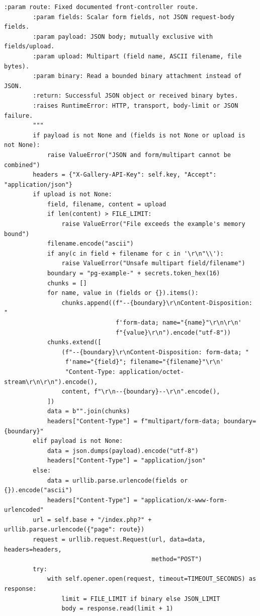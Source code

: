 \documentclass[11pt,a4paper]{article}
\begin{document}
\begin{lstlisting}[language={}]
        :param route: Fixed documented front-controller route.
        :param fields: Scalar form fields, not JSON request-body fields.
        :param payload: JSON body; mutually exclusive with fields/upload.
        :param upload: Multipart (field name, ASCII filename, file bytes).
        :param binary: Read a bounded binary attachment instead of JSON.
        :return: Successful JSON object or received binary bytes.
        :raises RuntimeError: HTTP, transport, body-limit or JSON failure.
        """
        if payload is not None and (fields is not None or upload is not None):
            raise ValueError("JSON and form/multipart cannot be combined")
        headers = {"X-Gallery-API-Key": self.key, "Accept": "application/json"}
        if upload is not None:
            field, filename, content = upload
            if len(content) > FILE_LIMIT:
                raise ValueError("File exceeds the example's memory bound")
            filename.encode("ascii")
            if any(c in field + filename for c in '\r\n"\\'):
                raise ValueError("Unsafe multipart field/filename")
            boundary = "pg-example-" + secrets.token_hex(16)
            chunks = []
            for name, value in (fields or {}).items():
                chunks.append((f"--{boundary}\r\nContent-Disposition: "
                               f'form-data; name="{name}"\r\n\r\n'
                               f"{value}\r\n").encode("utf-8"))
            chunks.extend([
                (f"--{boundary}\r\nContent-Disposition: form-data; "
                 f'name="{field}"; filename="{filename}"\r\n'
                 "Content-Type: application/octet-stream\r\n\r\n").encode(),
                content, f"\r\n--{boundary}--\r\n".encode(),
            ])
            data = b"".join(chunks)
            headers["Content-Type"] = f"multipart/form-data; boundary={boundary}"
        elif payload is not None:
            data = json.dumps(payload).encode("utf-8")
            headers["Content-Type"] = "application/json"
        else:
            data = urllib.parse.urlencode(fields or {}).encode("ascii")
            headers["Content-Type"] = "application/x-www-form-urlencoded"
        url = self.base + "/index.php?" + urllib.parse.urlencode({"page": route})
        request = urllib.request.Request(url, data=data, headers=headers,
                                         method="POST")
        try:
            with self.opener.open(request, timeout=TIMEOUT_SECONDS) as response:
                limit = FILE_LIMIT if binary else JSON_LIMIT
                body = response.read(limit + 1)

\end{lstlisting}
\end{document}
